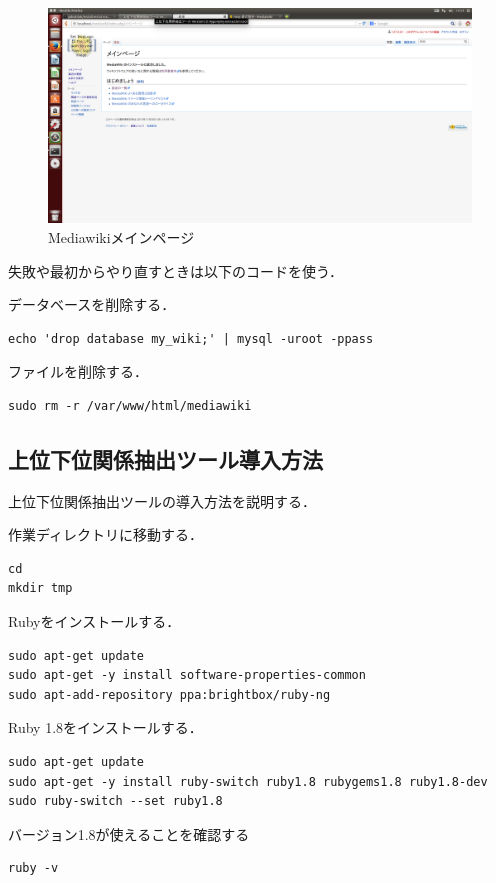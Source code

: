 \begin{figure}[ht]
\centering
\includegraphics[width=15cm]{mein}
\caption{Mediawikiメインページ}\label{mein}
\end{figure}

失敗や最初からやり直すときは以下のコードを使う．

データベースを削除する．
{\small
\begin{verbatim}
echo 'drop database my_wiki;' | mysql -uroot -ppass
\end{verbatim}}

ファイルを削除する．
{\small
\begin{verbatim}
sudo rm -r /var/www/html/mediawiki
\end{verbatim}}

\subsection{上位下位関係抽出ツール導入方法}
上位下位関係抽出ツールの導入方法を説明する．

作業ディレクトリに移動する．
{\small
\begin{verbatim}
cd
mkdir tmp
\end{verbatim}}

Rubyをインストールする．
{\small
\begin{verbatim}
sudo apt-get update
sudo apt-get -y install software-properties-common
sudo apt-add-repository ppa:brightbox/ruby-ng
\end{verbatim}}

Ruby 1.8をインストールする．
{\small
\begin{verbatim}
sudo apt-get update
sudo apt-get -y install ruby-switch ruby1.8 rubygems1.8 ruby1.8-dev
sudo ruby-switch --set ruby1.8
\end{verbatim}}

バージョン1.8が使えることを確認する
{\small
\begin{verbatim}
ruby -v
\end{verbatim}}

